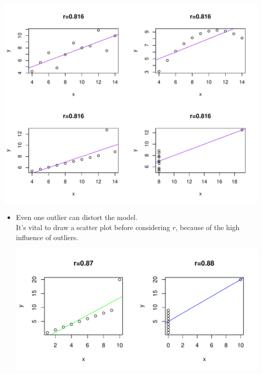\documentclass[t,xcolor=pdftex,dvipsnames,table]{beamer}
\makeatletter
\def\maxwidth{ %
  \ifdim\Gin@nat@width>\linewidth
    \linewidth
  \else
    \Gin@nat@width
  \fi
}
\newenvironment{knitrout}{}{} %
\makeatother
\begin{document}
\begin{frame}[fragile]{}

\begin{knitrout}
\color{fgcolor}
\includegraphics[width=\maxwidth]{figure/unnamed-chunk-12-1} 

\end{knitrout}
\end{frame} 


\begin{frame}[fragile]{}

\begin{itemize}
\item Even one outlier can distort the model.  \\

It's vital to draw a scatter plot before considering $r$, because of the high influence of outliers.

\begin{knitrout}
\color{fgcolor}
\includegraphics[width=\maxwidth]{figure/unnamed-chunk-13-1} 

\end{knitrout}
\end{itemize}
\end{frame}
\end{document}
